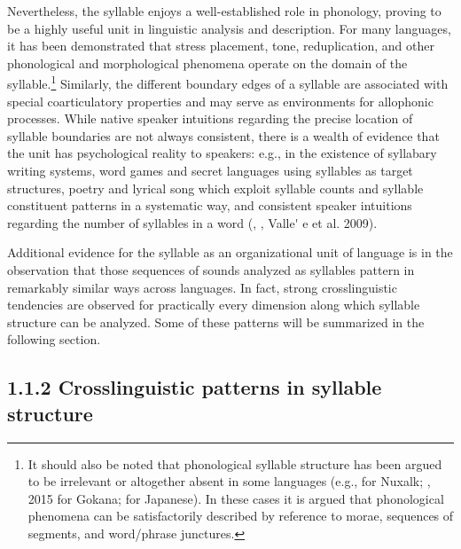   Nevertheless, the syllable enjoys a well-established role in phonology, proving to be a highly useful unit in linguistic analysis and description. For many languages, it has been demonstrated that stress placement, tone, reduplication, and other phonological and morphological phenomena operate on the domain of the syllable.\footnote{ \textrm{It should also be noted that phonological syllable structure has been argued to be irrelevant or altogether absent in some languages (e.g., \citealt{Newman1947} for Nuxalk; \citealt{Hyman2011}, 2015 for Gokana; \citealt{Labrune2012} for Japanese). In these cases it is argued that phonological phenomena can be satisfactorily described by reference to morae, sequences of segments, and word/phrase junctures.}} Similarly, the different boundary edges of a syllable are associated with special coarticulatory properties and may serve as environments for allophonic processes. While native speaker intuitions regarding the precise location of syllable boundaries are not always consistent, there is a wealth of evidence that the unit has psychological reality to speakers: e.g., in the existence of syllabary writing systems, word games and secret languages using syllables as target structures, poetry and lyrical song which exploit syllable counts and syllable constituent patterns in a systematic way, and consistent speaker intuitions regarding the number of syllables in a word (\citealt{BellHooper1978}, \citealt{Blevins1995}, Valle\'{} e et al. 2009).



  Additional evidence for the syllable as an organizational unit of language is in the observation that those sequences of sounds analyzed as syllables pattern in remarkably similar ways across languages. In fact, strong crosslinguistic tendencies are observed for practically every dimension along which syllable structure can be analyzed. Some of these patterns will be summarized in the following section.


\subsection{1.1.2 Crosslinguistic patterns in syllable structure}

